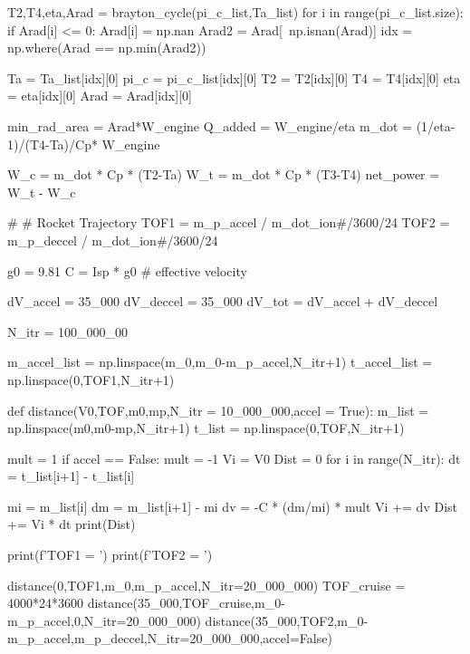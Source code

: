 \documentclass[journal ]{new-aiaa}
\begin{document}
\begin{python}
    T2,T4,eta,Arad = brayton_cycle(pi_c_list,Ta_list)
    for i in range(pi_c_list.size):
        if Arad[i] <= 0:
            Arad[i] = np.nan 
    Arad2 = Arad[~np.isnan(Arad)]
    idx = np.where(Arad == np.min(Arad2))

    Ta = Ta_list[idx][0]
    pi_c = pi_c_list[idx][0]
    T2 = T2[idx][0]
    T4 = T4[idx][0]
    eta = eta[idx][0]
    Arad = Arad[idx][0]


    min_rad_area = Arad*W_engine
    Q_added = W_engine/eta
    m_dot = (1/eta-1)/(T4-Ta)/Cp* W_engine

    W_c = m_dot * Cp * (T2-Ta)
    W_t = m_dot * Cp * (T3-T4)
    net_power = W_t - W_c

    # # Rocket Trajectory
    TOF1 = m_p_accel / m_dot_ion#/3600/24
    TOF2 = m_p_deccel / m_dot_ion#/3600/24

    g0 = 9.81
    C = Isp * g0 # effective velocity

    dV_accel = 35_000
    dV_deccel = 35_000
    dV_tot = dV_accel + dV_deccel

    N_itr = 100_000_00

    m_accel_list = np.linspace(m_0,m_0-m_p_accel,N_itr+1)
    t_accel_list = np.linspace(0,TOF1,N_itr+1) 


    def distance(V0,TOF,m0,mp,N_itr = 10_000_000,accel = True):
        m_list = np.linspace(m0,m0-mp,N_itr+1)
        t_list = np.linspace(0,TOF,N_itr+1) 

        mult = 1
        if accel == False:
            mult = -1
        Vi = V0
        Dist = 0
        for i in range(N_itr):
            dt = t_list[i+1] - t_list[i]
            
            mi = m_list[i]
            dm = m_list[i+1] - mi
            dv = -C * (dm/mi) * mult
            Vi += dv
            Dist += Vi * dt
        print(Dist)


    print(f'{TOF1 = }')
    print(f'{TOF2 = }')

    distance(0,TOF1,m_0,m_p_accel,N_itr=20_000_000)
    TOF_cruise = 4000*24*3600
    distance(35_000,TOF_cruise,m_0-m_p_accel,0,N_itr=20_000_000)
    distance(35_000,TOF2,m_0-m_p_accel,m_p_deccel,N_itr=20_000_000,accel=False)
\end{python}
    
\end{document}
